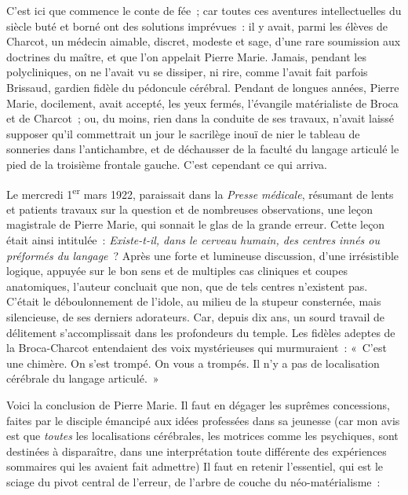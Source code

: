 \documentclass[french,twoside]{book} %
\begin{document}
C’est ici que commence le conte de fée ; car toutes ces aventures intellectuelles du siècle buté et borné ont des solutions imprévues : il y avait, parmi les élèves de Charcot, un médecin aimable, discret, modeste et sage, d’une rare soumission aux doctrines du maître, et que l’on appelait Pierre Marie. Jamais, pendant les polycliniques, on ne l’avait vu se dissiper, ni rire, comme l’avait fait parfois Brissaud, gardien fidèle du pédoncule cérébral. Pendant de longues années, Pierre Marie, docilement, avait accepté, les yeux fermés, l’évangile matérialiste de Broca et de Charcot ; ou, du moins, rien dans la conduite de ses travaux, n’avait laissé supposer qu’il commettrait un jour le sacrilège inouï de nier le tableau de sonneries dans l’antichambre, et de déchausser de la faculté du langage articulé le pied de la troisième frontale gauche. C’est cependant ce qui arriva.\par
Le mercredi 1\textsuperscript{er} mars 1922, paraissait dans la {\itshape Presse médicale}, résumant de lents et patients travaux sur la question et de nombreuses observations, une leçon magistrale de Pierre Marie, qui sonnait le glas de la grande erreur. Cette leçon était ainsi intitulée : {\itshape Existe-t-il, dans le cerveau humain, des centres innés ou préformés du langage} ? Après une forte et lumineuse discussion, d’une irrésistible logique, appuyée sur le bon sens et de multiples cas cliniques et coupes anatomiques, l’auteur concluait que non, que de tels centres n’existent pas. C’était le déboulonnement de l’idole, au milieu de la stupeur consternée, mais silencieuse, de ses derniers adorateurs. Car, depuis dix ans, un sourd travail de délitement s’accomplissait dans les profondeurs du temple. Les fidèles adeptes de la Broca-Charcot entendaient des voix mystérieuses qui murmuraient : « C’est une chimère. On s’est trompé. On vous a trompés. Il n’y a pas de localisation cérébrale du langage articulé. »\par
Voici la conclusion de Pierre Marie. Il faut en dégager les suprêmes concessions, faites par le disciple émancipé aux idées professées dans sa jeunesse (car mon avis est que {\itshape toutes} les localisations cérébrales, les motrices comme les psychiques, sont destinées à disparaître, dans une interprétation toute différente des expériences sommaires qui les avaient fait admettre) Il faut en retenir l’essentiel, qui est le sciage du pivot central de l’erreur, de l’arbre de couche du néo-matérialisme :\par
\end{document}
